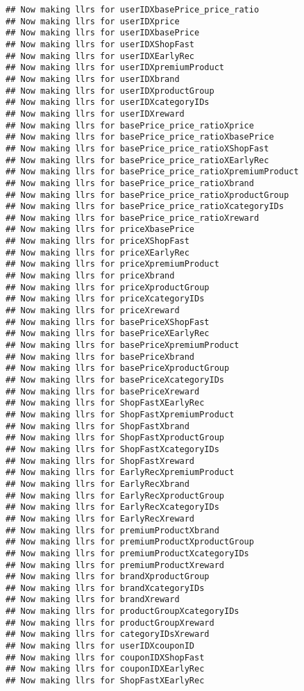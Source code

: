 \documentclass[10pt]{report}
\begin{document}
\begin{verbatim}
## Now making llrs for userIDXbasePrice_price_ratio
## Now making llrs for userIDXprice
## Now making llrs for userIDXbasePrice
## Now making llrs for userIDXShopFast
## Now making llrs for userIDXEarlyRec
## Now making llrs for userIDXpremiumProduct
## Now making llrs for userIDXbrand
## Now making llrs for userIDXproductGroup
## Now making llrs for userIDXcategoryIDs
## Now making llrs for userIDXreward
## Now making llrs for basePrice_price_ratioXprice
## Now making llrs for basePrice_price_ratioXbasePrice
## Now making llrs for basePrice_price_ratioXShopFast
## Now making llrs for basePrice_price_ratioXEarlyRec
## Now making llrs for basePrice_price_ratioXpremiumProduct
## Now making llrs for basePrice_price_ratioXbrand
## Now making llrs for basePrice_price_ratioXproductGroup
## Now making llrs for basePrice_price_ratioXcategoryIDs
## Now making llrs for basePrice_price_ratioXreward
## Now making llrs for priceXbasePrice
## Now making llrs for priceXShopFast
## Now making llrs for priceXEarlyRec
## Now making llrs for priceXpremiumProduct
## Now making llrs for priceXbrand
## Now making llrs for priceXproductGroup
## Now making llrs for priceXcategoryIDs
## Now making llrs for priceXreward
## Now making llrs for basePriceXShopFast
## Now making llrs for basePriceXEarlyRec
## Now making llrs for basePriceXpremiumProduct
## Now making llrs for basePriceXbrand
## Now making llrs for basePriceXproductGroup
## Now making llrs for basePriceXcategoryIDs
## Now making llrs for basePriceXreward
## Now making llrs for ShopFastXEarlyRec
## Now making llrs for ShopFastXpremiumProduct
## Now making llrs for ShopFastXbrand
## Now making llrs for ShopFastXproductGroup
## Now making llrs for ShopFastXcategoryIDs
## Now making llrs for ShopFastXreward
## Now making llrs for EarlyRecXpremiumProduct
## Now making llrs for EarlyRecXbrand
## Now making llrs for EarlyRecXproductGroup
## Now making llrs for EarlyRecXcategoryIDs
## Now making llrs for EarlyRecXreward
## Now making llrs for premiumProductXbrand
## Now making llrs for premiumProductXproductGroup
## Now making llrs for premiumProductXcategoryIDs
## Now making llrs for premiumProductXreward
## Now making llrs for brandXproductGroup
## Now making llrs for brandXcategoryIDs
## Now making llrs for brandXreward
## Now making llrs for productGroupXcategoryIDs
## Now making llrs for productGroupXreward
## Now making llrs for categoryIDsXreward
## Now making llrs for userIDXcouponID
## Now making llrs for couponIDXShopFast
## Now making llrs for couponIDXEarlyRec
## Now making llrs for ShopFastXEarlyRec
\end{verbatim}
\end{document}
